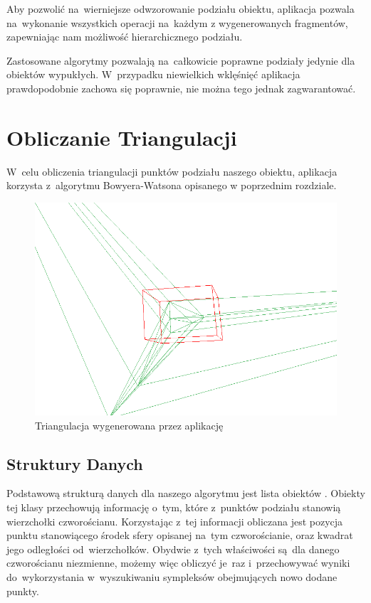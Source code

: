 \documentclass[skorowidz,autorrok,backref,xodstep,oswiadczenie]{wmimgr}
\begin{document}
Aby pozwolić na~wierniejsze odwzorowanie podziału obiektu, aplikacja pozwala na~wykonanie wszystkich operacji na~każdym z wygenerowanych fragmentów, zapewniając nam możliwość hierarchicznego podziału.

Zastosowane algorytmy pozwalają na~całkowicie poprawne podziały jedynie dla obiektów wypukłych. W~przypadku niewielkich wklęśnięć aplikacja prawdopodobnie zachowa się poprawnie, nie można tego jednak zagwarantować.

\section{Obliczanie Triangulacji}

W~celu obliczenia triangulacji punktów podziału naszego obiektu, aplikacja korzysta z~algorytmu Bowyera-Watsona opisanego w poprzednim rozdziale.

\begin{figure}[ht!]
\centering
\includegraphics[width=140mm]{images/app1_1.png}
\caption{Triangulacja wygenerowana przez aplikację}
\label{apptriangulation}
\end{figure}

\subsection{Struktury Danych}

Podstawową strukturą danych dla naszego algorytmu jest lista obiektów . Obiekty tej klasy przechowują informację o~tym, które z~punktów podziału stanowią wierzchołki czworościanu. Korzystając z~tej informacji obliczana jest pozycja punktu stanowiącego środek sfery opisanej na~tym czworościanie, oraz kwadrat jego odległości od~wierzchołków. Obydwie z~tych właściwości są~dla danego czworościanu niezmienne, możemy więc obliczyć je~raz i~przechowywać wyniki do~wykorzystania w~wyszukiwaniu sympleksów obejmujących nowo dodane punkty.
\end{document}

